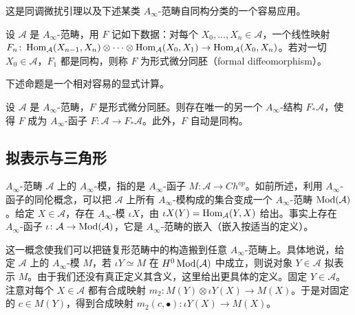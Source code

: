 这是同调微扰引理以及下述某类 $A_\infty$-范畴自同构分类的一个容易应用。

设 $\mathcal{A}$ 是 $A_\infty$-范畴，用 $F$ 记如下数据：对每个 $X_0,\dots,X_n\in\mathcal{A}$，一个线性映射 $F_n\colon\operatorname{Hom}_{\mathcal{A}}(X_{n-1},X_n)\otimes\cdots\otimes\operatorname{Hom}_{\mathcal{A}}(X_0,X_1)\to\operatorname{Hom}_{\mathcal{A}}(X_0,X_n)$。若对一切 $X_0\in\mathcal{A}$，$F_1$ 都是同构，则称 $F$ 为形式微分同胚（formal diffeomorphism）。

下述命题是一个相对容易的显式计算。

\begin{proposition}\label{prop:2.2}
设 $\mathcal{A}$ 是 $A_\infty$-范畴，$F$ 是形式微分同胚。则存在唯一的另一个 $A_\infty$-结构 $F_*\mathcal{A}$，使得 $F$ 成为 $A_\infty$-函子 $F\colon\mathcal{A}\to F_*\mathcal{A}$。此外，$F$ 自动是同构。
\end{proposition}


\subsection{拟表示与三角形}\label{subsec:ainf-quasirep}

$A_\infty$-范畴 $\mathcal{A}$ 上的 $A_\infty$-模，指的是 $A_\infty$-函子 $M\colon\mathcal{A}\to Ch^{op}$。如前所述，利用 $A_\infty$-函子的同伦概念，可以把 $\mathcal{A}$ 上所有 $A_\infty$-模构成的集合变成一个 $A_\infty$-范畴 $\operatorname{Mod}(\mathcal{A})$。给定 $X\in\mathcal{A}$，存在 $A_\infty$-模 $\iota X$，由 $\iota X(Y)=\operatorname{Hom}_{\mathcal{A}}(Y,X)$ 给出。事实上存在 $A_\infty$-函子 $\iota\colon\mathcal{A}\to\operatorname{Mod}(\mathcal{A})$，它是 $A_\infty$-范畴的嵌入（嵌入按适当的定义）。

这一概念使我们可以把链复形范畴中的构造搬到任意 $A_\infty$-范畴上。具体地说，给定 $\mathcal{A}$ 上的 $A_\infty$-模 $M$，若 $\iota Y\simeq M$ 在 $H^0\operatorname{Mod}(\mathcal{A})$ 中成立，则说对象 $Y\in\mathcal{A}$ 拟表示 $M$。由于我们还没有真正定义其含义，这里给出更具体的定义。固定 $Y\in\mathcal{A}$。注意对每个 $X\in\mathcal{A}$ 都有合成映射 $m_2\colon M(Y)\otimes\iota Y(X)\to M(X)$。于是对固定的 $c\in M(Y)$，得到合成映射 $m_2(c,\bullet)\colon\iota Y(X)\to M(X)$。

